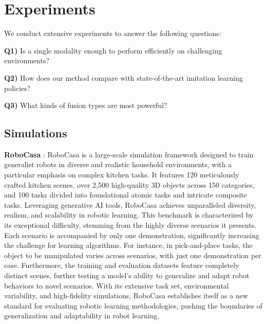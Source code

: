 \section{Experiments}
\label{sec:experiments}

We conduct extensive experiments to answer the following questions:

\textbf{Q1)} Is a single modality enough to perform efficiently on challenging environments?

\textbf{Q2)} How does our method compare with state-of-the-art imitation learning policies?

\textbf{Q3)} What kinds of fusion types are most powerful?


\subsection{Simulations}

\textbf{RoboCasa} \cite{robocasa2024}:
RoboCasa is a large-scale simulation framework designed to train generalist robots in diverse and realistic household environments, with a particular emphasis on complex kitchen tasks. It features 120 meticulously crafted kitchen scenes, over 2,500 high-quality 3D objects across 150 categories, and 100 tasks divided into foundational atomic tasks and intricate composite tasks. Leveraging generative AI tools, RoboCasa achieves unparalleled diversity, realism, and scalability in robotic learning.
This benchmark is characterized by its exceptional difficulty, stemming from the highly diverse scenarios it presents. Each scenario is accompanied by only one demonstration, significantly increasing the challenge for learning algorithms. For instance, in pick-and-place tasks, the object to be manipulated varies across scenarios, with just one demonstration per case. Furthermore, the training and evaluation datasets feature completely distinct scenes, further testing a model’s ability to generalize and adapt robot behaviors to novel scenarios.
With its extensive task set, environmental variability, and high-fidelity simulations, RoboCasa establishes itself as a new standard for evaluating robotic learning methodologies, pushing the boundaries of generalization and adaptability in robot learning.

